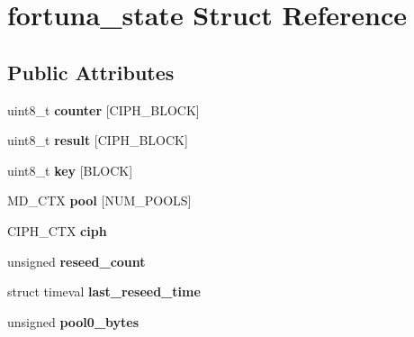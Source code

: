 \hypertarget{structfortuna__state}{\section{fortuna\-\_\-state Struct Reference}
\label{structfortuna__state}
}
\subsection*{Public Attributes}
\begin{DoxyCompactItemize}
\item 
\hypertarget{structfortuna__state_a712f2d742f17822cabffdce3c8251b31}{uint8\-\_\-t {\bfseries counter} \mbox{[}C\-I\-P\-H\-\_\-\-B\-L\-O\-C\-K\mbox{]}}\label{structfortuna__state_a712f2d742f17822cabffdce3c8251b31}

\item 
\hypertarget{structfortuna__state_a6702a9592d06948007083e73f265f195}{uint8\-\_\-t {\bfseries result} \mbox{[}C\-I\-P\-H\-\_\-\-B\-L\-O\-C\-K\mbox{]}}\label{structfortuna__state_a6702a9592d06948007083e73f265f195}

\item 
\hypertarget{structfortuna__state_a332c9aef8a5ef7dc968aa68a7fda04e5}{uint8\-\_\-t {\bfseries key} \mbox{[}B\-L\-O\-C\-K\mbox{]}}\label{structfortuna__state_a332c9aef8a5ef7dc968aa68a7fda04e5}

\item 
\hypertarget{structfortuna__state_a53d7ea36f61adaa577f1328071abc3e8}{M\-D\-\_\-\-C\-T\-X {\bfseries pool} \mbox{[}N\-U\-M\-\_\-\-P\-O\-O\-L\-S\mbox{]}}\label{structfortuna__state_a53d7ea36f61adaa577f1328071abc3e8}

\item 
\hypertarget{structfortuna__state_a95ce19ebcf8f4b5194747800cda1c30c}{C\-I\-P\-H\-\_\-\-C\-T\-X {\bfseries ciph}}\label{structfortuna__state_a95ce19ebcf8f4b5194747800cda1c30c}

\item 
\hypertarget{structfortuna__state_aa8237da33b2f2838320097ed06837879}{unsigned {\bfseries reseed\-\_\-count}}\label{structfortuna__state_aa8237da33b2f2838320097ed06837879}

\item 
\hypertarget{structfortuna__state_a6d4e1a0a714f4826e1ac2568ef39362c}{struct timeval {\bfseries last\-\_\-reseed\-\_\-time}}\label{structfortuna__state_a6d4e1a0a714f4826e1ac2568ef39362c}

\item 
\hypertarget{structfortuna__state_aaf71b2ed6c86a11f8abbe5ee3277c4a5}{unsigned {\bfseries pool0\-\_\-bytes}}\label{structfortuna__state_aaf71b2ed6c86a11f8abbe5ee3277c4a5}


\end{DoxyCompactItemize}
